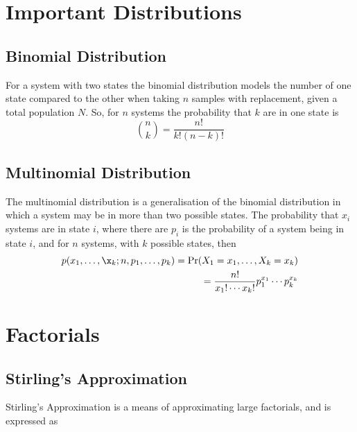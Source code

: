 
\section{Important Distributions}
\label{sec:import-distr}

\subsection{Binomial Distribution}
\label{sec:binom-distr}

For a system with two states the binomial distribution models the
number of one state compared to the other when taking $n$ samples with
replacement, given a total population $N$. So, for $n$ systems the
probability that $k$ are in one state is
\begin{equation}
  \label{eq:5}
  {n \choose k} = \frac{n!}{k!(n-k)!}
\end{equation}

\subsection{Multinomial Distribution}
\label{sec:mult-distr}

The multinomial distribution is a generalisation of the binomial
distribution in which a system may be in more than two possible
states.  The probability that $x_i$ systems are in state $i$, where
there are $p_i$ is the probability of a system being in state $i$, and
for $n$ systems, with $k$ possible states, then
\begin{equation}
  \label{eq:6}
  \begin{split}
    p(x_1, \dots, \x_k; n, p_1, \dots, p_k) = \Pr(X_1 = x_1, \dots, X_k = x_k) \\ = \frac{n!}{x_1!\cdots x_k!} p_1^{x_1}\cdots p_k^{x_k}
  \end{split}
\end{equation}

\section{Factorials}
\label{sec:factorials}

\subsection{Stirling's Approximation}
\label{sec:stirl-appr}

Stirling's Approximation is a means of approximating large factorials,
and is expressed as

